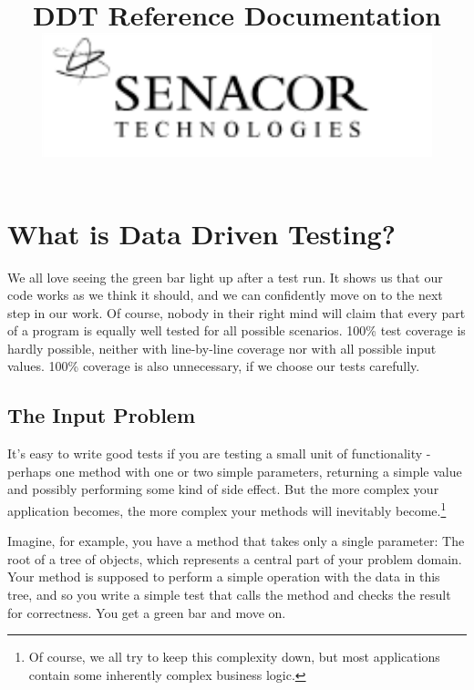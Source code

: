 


\title{DDT Reference Documentation\\
\vskip 0.5cm \includegraphics[scale=0.5]{image/logo.pdf}}

\maketitle 
\thispagestyle{empty}
\tableofcontents
\newpage

\section{What is Data Driven Testing?} %
\label{sec:what_is_ddt}

We all love seeing the green bar light up after a test run. It shows us that our code works as we think it should, and we can confidently move on to the next step in our work. Of course, nobody in their right mind will claim that every part of a program is equally well tested for all possible scenarios. 100\% test coverage is hardly possible, neither with line-by-line coverage nor with all possible input values. 100\% coverage is also unnecessary, if we choose our tests carefully.

\subsection{The Input Problem} %
\label{sec:input_problem}

It's easy to write good tests if you are testing a small unit of functionality - perhaps one method with one or two simple parameters, returning a simple value and possibly performing some kind of side effect. But the more complex your application becomes, the more complex your methods will inevitably become.\footnote{Of course, we all try to keep this complexity down, but most applications contain some inherently complex business logic.}

Imagine, for example, you have a method that takes only a single parameter: The root of a tree of objects, which represents a central part of your problem domain. Your method is supposed to perform a simple operation with the data in this tree, and so you write a simple test that calls the method and checks the result for correctness. You get a green bar and move on.

